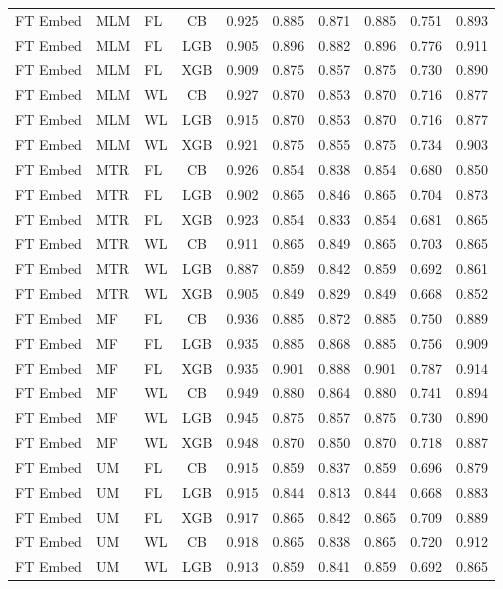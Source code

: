 \documentclass[9pt,a4paper]{article}
\begin{document}
\begin{scriptsize}
\begin{longtable}{lllcrrrrrr}
\midrule
FT Embed & MLM & FL & CB  & 0.925 & 0.885 & 0.871 & 0.885 & 0.751 & 0.893 \\
FT Embed & MLM & FL & LGB & 0.905 & 0.896 & 0.882 & 0.896 & 0.776 & 0.911 \\
FT Embed & MLM & FL & XGB & 0.909 & 0.875 & 0.857 & 0.875 & 0.730 & 0.890 \\
FT Embed & MLM & WL & CB  & 0.927 & 0.870 & 0.853 & 0.870 & 0.716 & 0.877 \\
FT Embed & MLM & WL & LGB & 0.915 & 0.870 & 0.853 & 0.870 & 0.716 & 0.877 \\
FT Embed & MLM & WL & XGB & 0.921 & 0.875 & 0.855 & 0.875 & 0.734 & 0.903 \\
FT Embed & MTR & FL & CB  & 0.926 & 0.854 & 0.838 & 0.854 & 0.680 & 0.850 \\
FT Embed & MTR & FL & LGB & 0.902 & 0.865 & 0.846 & 0.865 & 0.704 & 0.873 \\
FT Embed & MTR & FL & XGB & 0.923 & 0.854 & 0.833 & 0.854 & 0.681 & 0.865 \\
FT Embed & MTR & WL & CB  & 0.911 & 0.865 & 0.849 & 0.865 & 0.703 & 0.865 \\
FT Embed & MTR & WL & LGB & 0.887 & 0.859 & 0.842 & 0.859 & 0.692 & 0.861 \\
FT Embed & MTR & WL & XGB & 0.905 & 0.849 & 0.829 & 0.849 & 0.668 & 0.852 \\
FT Embed & MF  & FL & CB  & 0.936 & 0.885 & 0.872 & 0.885 & 0.750 & 0.889 \\
FT Embed & MF  & FL & LGB & 0.935 & 0.885 & 0.868 & 0.885 & 0.756 & 0.909 \\
FT Embed & MF  & FL & XGB & 0.935 & 0.901 & 0.888 & 0.901 & 0.787 & 0.914 \\
FT Embed & MF  & WL & CB  & 0.949 & 0.880 & 0.864 & 0.880 & 0.741 & 0.894 \\
FT Embed & MF  & WL & LGB & 0.945 & 0.875 & 0.857 & 0.875 & 0.730 & 0.890 \\
FT Embed & MF  & WL & XGB & 0.948 & 0.870 & 0.850 & 0.870 & 0.718 & 0.887 \\
FT Embed & UM  & FL & CB  & 0.915 & 0.859 & 0.837 & 0.859 & 0.696 & 0.879 \\
FT Embed & UM  & FL & LGB & 0.915 & 0.844 & 0.813 & 0.844 & 0.668 & 0.883 \\
FT Embed & UM  & FL & XGB & 0.917 & 0.865 & 0.842 & 0.865 & 0.709 & 0.889 \\
FT Embed & UM  & WL & CB  & 0.918 & 0.865 & 0.838 & 0.865 & 0.720 & 0.912 \\
FT Embed & UM  & WL & LGB & 0.913 & 0.859 & 0.841 & 0.859 & 0.692 & 0.865 \\

\end{longtable}
\end{scriptsize}
\end{document}
